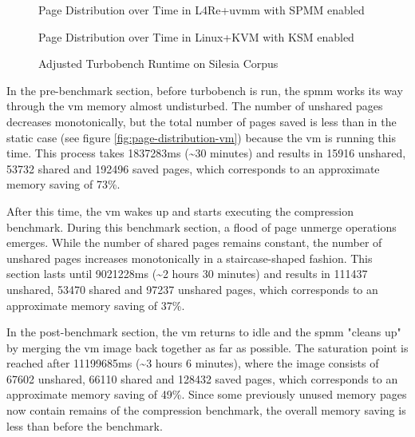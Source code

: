 \begin{figure}
  \centering
  
  \caption{Page Distribution over Time in L4Re+uvmm with SPMM enabled}
  \label{fig:page-distribution-turbobench-silesia}
  \centering
  
  \caption{Page Distribution over Time in Linux+KVM with KSM enabled}
  \label{fig:page-distribution-ksm-turbobench-silesia}
  \centering
  
  \caption{Adjusted Turbobench Runtime on Silesia Corpus}
  \label{fig:runtime-turbobench-silesia}
\end{figure}

In the pre-benchmark section, before turbobench is run, the \ac{spmm} works its way through the \ac{vm} memory almost undisturbed.
The number of unshared pages decreases monotonically, but the total number of pages saved is less than in the static case (see figure \ref{fig:page-distribution-vm}) because the \ac{vm} is running this time.
This process takes 1837283ms (\textasciitilde{}30 minutes) and results in 15916 unshared, 53732 shared and 192496 saved pages, which corresponds to an approximate memory saving of 73\%.

After this time, the \ac{vm} wakes up and starts executing the compression benchmark.
During this benchmark section, a flood of page unmerge operations emerges.
While the number of shared pages remains constant, the number of unshared pages increases monotonically in a staircase-shaped fashion.
This section lasts until 9021228ms (\textasciitilde{}2 hours 30 minutes) and results in 111437 unshared, 53470 shared and 97237 unshared pages, which corresponds to an approximate memory saving of 37\%.

In the post-benchmark section, the \ac{vm} returns to idle and the \ac{spmm} "cleans up" by merging the \ac{vm} image back together as far as possible.
The saturation point is reached after 11199685ms (\textasciitilde{}3 hours 6 minutes), where the image consists of 67602 unshared, 66110 shared and 128432 saved pages, which corresponds to an approximate memory saving of 49\%.
Since some previously unused memory pages now contain remains of the compression benchmark, the overall memory saving is less than before the benchmark.

